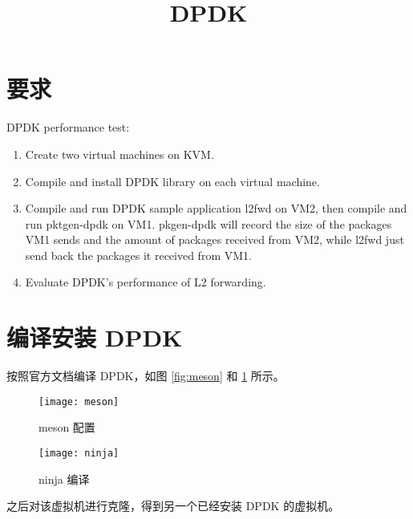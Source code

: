 

    \title{DPDK}
    \maketitle
    \tableofcontents
    \section{要求}

    DPDK performance test:

    \begin{enumerate}[(1)]
        \item Create two virtual machines on KVM.
        \item Compile and install DPDK library on each virtual machine.
        \item Compile and run DPDK sample application l2fwd on VM2, then compile and run pktgen-dpdk on VM1.  pkgen-dpdk will record the size of the packages VM1 sends and the amount of packages received from VM2,  while l2fwd just send back the packages it received from VM1.
        \item Evaluate DPDK's performance of L2 forwarding.
    \end{enumerate}

    \section{编译安装 DPDK}

    按照官方文档\cite{dpdk}编译 DPDK，如图 \ref{fig:meson} 和 \ref{fig:ninja} 所示。


    \begin{figure}[H]
        \centering
        \begin{minipage}{0.48\textwidth}
            \centering
            \texttt{[image: meson]}
            \caption{meson 配置}\label{fig:meson}
        \end{minipage}
        \begin{minipage}{0.48\textwidth}
            \centering
            \texttt{[image: ninja]}
            \caption{ninja 编译}\label{fig:ninja}
        \end{minipage}
    \end{figure}

    之后对该虚拟机进行克隆，得到另一个已经安装 DPDK 的虚拟机。

    

